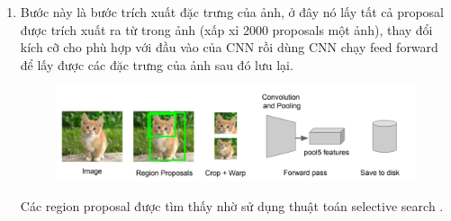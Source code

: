 \begin{enumerate}
    \item Bước này là bước trích xuất đặc trưng của ảnh, ở đây nó lấy tất cả proposal được trích xuất ra từ trong ảnh (xấp xỉ 2000 proposals một ảnh), thay đổi kích cỡ cho phù hợp với đầu vào của CNN rồi dùng CNN chạy feed forward để lấy được các đặc trưng của ảnh sau đó lưu lại.
    \begin{center}
    	\begin{figure}[H]
	    \centering
	    \includegraphics[width=0.8\columnwidth]{images/chap2/rcnn_3.png}
	    \label{fig:2.30}
	    \end{figure}
	\end{center}
	Các region proposal được tìm thấy nhờ sử dụng thuật toán selective search \cite{uijlings2013selective}.
	

\end{enumerate}
